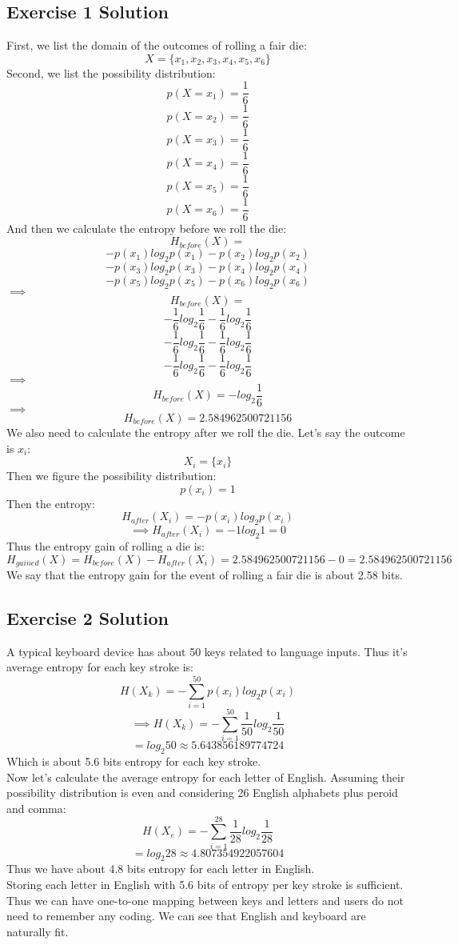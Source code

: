 \documentclass[12pt]{article}
\begin{document}
\subsection{Exercise 1 Solution}
First, we list the domain of the outcomes of rolling a fair die:
\[
	X = \{x_1, x_2, x_3, x_4, x_5, x_6\}
\]
Second, we list the possibility distribution:
\[
	p(X=x_1) = \frac{1}{6}
\]
\[
	p(X=x_2) = \frac{1}{6}
\]
\[
	p(X=x_3) = \frac{1}{6}
\]
\[
	p(X=x_4) = \frac{1}{6}
\]
\[
	p(X=x_5) = \frac{1}{6}
\]
\[
	p(X=x_6) = \frac{1}{6}
\]
And then we calculate the entropy before we roll the die:
\[
	H_{before}(X) = 
\]
\[
	-p(x_1)log_{2}p(x_1)  
	- p(x_2)log_{2}p(x_2)
\]
\[
	- p(x_3)log_{2}p(x_3)
	- p(x_4)log_{2}p(x_4)
\]
\[
	- p(x_5)log_{2}p(x_5)
	- p(x_6)log_{2}p(x_6)
\]
$\implies$
\[
	H_{before}(X) = 
\]
\[
	-\frac{1}{6}log_{2}\frac{1}{6}  
	-\frac{1}{6}log_{2}\frac{1}{6}  
\]
\[
	-\frac{1}{6}log_{2}\frac{1}{6}  
	-\frac{1}{6}log_{2}\frac{1}{6}  
\]
\[
	-\frac{1}{6}log_{2}\frac{1}{6}  
	-\frac{1}{6}log_{2}\frac{1}{6}  
\]
$\implies$
\[
	H_{before}(X) = 
	-log_{2}\frac{1}{6}  
\]
$\implies$
\[
	H_{before}(X) = 2.584962500721156 
\]
We also need to calculate the entropy after we roll the die.
Let's say the outcome is $x_i$:
\[
	X_i = \{x_i\}
\]
Then we figure the possibility distribution:
\[
	p(x_i) = 1
\]
Then the entropy:
\[
	H_{after}(X_i) = 
	-p(x_i)log_{2}p(x_i)  
\]
\[
\implies
	H_{after}(X_i) = 
	-1log_{2}1 = 0
\]  
Thus the entropy gain of rolling a die is:
\[
	H_{gained}(X) = H_{before}(X) - H_{after}(X_i) = 2.584962500721156 - 0 = 2.584962500721156
\]
We say that the entropy gain for the event of rolling a fair die is about 2.58 bits.

\subsection{Exercise 2 Solution}
A typical keyboard device has about 50 keys related to language inputs. Thus it's average entropy for each key stroke is:
\[
	H(X_k) = -\sum_{i=1}^{50}p(x_i)log_{2}p(x_i)
\]
\[
\implies
	H(X_k) = -\sum_{i=1}^{50}\frac{1}{50}log_{2}\frac{1}{50}
\]
\[
	= log_{2}50 \approx 5.643856189774724
\]
Which is about 5.6 bits entropy for each key stroke.\\
Now let's calculate the average entropy for each letter of English. Assuming their possibility distribution is even and considering 26 English alphabets plus peroid and comma:
\[
	H(X_e) = -\sum_{i=1}^{28}\frac{1}{28}log_{2}\frac{1}{28}
\]
\[
	= log_{2}28 \approx 4.807354922057604
\]
Thus we have about 4.8 bits entropy for each letter in English.\\
Storing each letter in English with 5.6 bits of entropy per key stroke is sufficient. Thus we can have one-to-one mapping between keys and letters and users do not need to remember any coding. We can see that English and keyboard are naturally fit.\\
\end{document}
